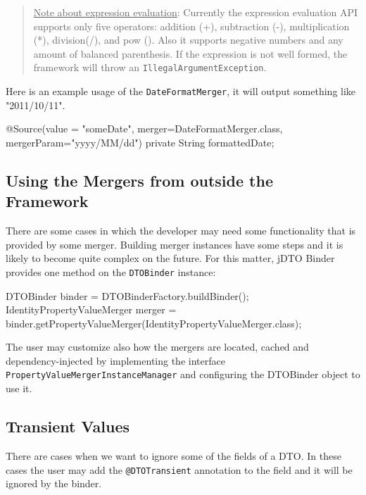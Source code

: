 \documentclass[11pt]{article}
\begin{document}
\begin{quote}\begin{footnotesize}

\underline{Note about expression evaluation}: Currently the expression evaluation API supports only five operators: addition (+), subtraction (-), multiplication (*), division(/), and pow (). Also it supports negative numbers and any amount of balanced parenthesis. If the expression is not well formed, the framework will throw an \texttt{IllegalArgumentException}.

\end{footnotesize}\end{quote}

Here is an example usage of the \texttt{DateFormatMerger}, it will output something like "2011/10/11".


\begin{java}
@Source(value = "someDate", 
    merger=DateFormatMerger.class, mergerParam="yyyy/MM/dd")
private String formattedDate;
\end{java}

\subsection{Using the Mergers from outside the Framework}

There are some cases in which the developer may need some functionality that is provided by some merger. Building merger instances have some steps and it is likely to become quite complex on the future. For this matter, jDTO Binder provides one method on the \texttt{DTOBinder} instance:

\begin{java}

DTOBinder binder = DTOBinderFactory.buildBinder();
IdentityPropertyValueMerger merger = binder.getPropertyValueMerger(IdentityPropertyValueMerger.class);

\end{java}

The user may customize also how the mergers are located, cached and dependency-injected by implementing the interface \texttt{PropertyValueMergerInstanceManager} and configuring the DTOBinder object to use it.

\subsection{Transient Values}


There are cases when we want to ignore some of the fields of a DTO. In these cases the user may add the \texttt{@DTOTransient} annotation to the field and it will be ignored by the binder.
\end{document}
